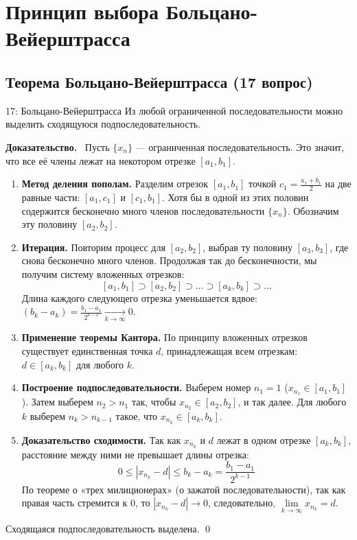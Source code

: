 \documentclass[a4paper,12pt]{article}
\newcommand{\myproof}{\textbf{Доказательство.}\ }
\begin{document}
	
	
	
	
	
	
	\newpage
	\section{Принцип выбора Больцано-Вейерштрасса}
	
	\subsection{Теорема Больцано-Вейерштрасса (17 вопрос)}
	
	\begin{theorembox}{17: Больцано-Вейерштрасса}
		Из любой ограниченной последовательности можно выделить сходящуюся подпоследовательность.
	\end{theorembox}
	
	\myproof
	Пусть $\{x_n\}$ — ограниченная последовательность. Это значит, что все её члены лежат на некотором отрезке $[a_1, b_1]$.
	
	\begin{enumerate}
		\item \textbf{Метод деления пополам.} Разделим отрезок $[a_1, b_1]$ точкой $c_1 = \frac{a_1 + b_1}{2}$ на две равные части: $[a_1, c_1]$ и $[c_1, b_1]$. Хотя бы в одной из этих половин содержится бесконечно много членов последовательности $\{x_n\}$. Обозначим эту половину $[a_2, b_2]$.
		
		\item \textbf{Итерация.} Повторим процесс для $[a_2, b_2]$, выбрав ту половину $[a_3, b_3]$, где снова бесконечно много членов. Продолжая так до бесконечности, мы получим систему вложенных отрезков:
		\[ [a_1, b_1] \supset [a_2, b_2] \supset \dots \supset [a_k, b_k] \supset \dots \]
		Длина каждого следующего отрезка уменьшается вдвое: $(b_k - a_k) = \frac{b_1 - a_1}{2^{k-1}} \xrightarrow[k \to \infty]{} 0$.
		
		\item \textbf{Применение теоремы Кантора.} По принципу вложенных отрезков существует единственная точка $d$, принадлежащая всем отрезкам: $d \in [a_k, b_k]$ для любого $k$.
		
		\item \textbf{Построение подпоследовательности.} Выберем номер $n_1 = 1$ ($x_{n_1} \in [a_1, b_1]$). Затем выберем $n_2 > n_1$ так, чтобы $x_{n_2} \in [a_2, b_2]$, и так далее. Для любого $k$ выберем $n_k > n_{k-1}$ такое, что $x_{n_k} \in [a_k, b_k]$.
		
		\item \textbf{Доказательство сходимости.} Так как $x_{n_k}$ и $d$ лежат в одном отрезке $[a_k, b_k]$, расстояние между ними не превышает длины отрезка:
		\[ 0 \le |x_{n_k} - d| \le b_k - a_k = \frac{b_1 - a_1}{2^{k-1}} \]
		По теореме о «трех милиционерах» (о зажатой последовательности), так как правая часть стремится к $0$, то $|x_{n_k} - d| \to 0$, следовательно, $\lim\limits_{k \to \infty} x_{n_k} = d$.
	\end{enumerate}
	Сходящаяся подпоследовательность выделена. \qed
	
\end{document}
